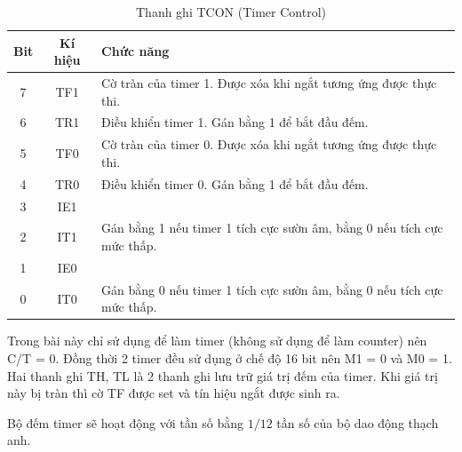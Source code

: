 \documentclass[../report.tex]{subfiles}
\begin{document}
\begin{table}[H]
\centering
\begin{tabular}{|c|c|l|}
\hline
\textbf{Bit} & \textbf{Kí hiệu} & \textbf{Chức năng}  \\
\hline
7 & TF1 & Cờ tràn của timer 1. Được xóa khi ngắt tương ứng được thực thi. \\
\hline
6 & TR1 & Điều khiển timer 1. Gán bằng 1 để bắt đầu đếm.  \\
\hline
5 & TF0 & Cờ tràn của timer 0. Được xóa khi ngắt tương ứng được thực thi. \\
\hline
4 & TR0 & Điều khiển timer 0. Gán bằng 1 để bắt đầu đếm. \\
\hline
3 & IE1 &  \\
\hline
2 & IT1 & Gán bằng 1 nếu timer 1 tích cực sườn âm, bằng 0 nếu tích cực mức thấp. \\
\hline
1 & IE0 & \\
\hline
0 & IT0 & Gán bằng 0 nếu timer 1 tích cực sườn âm, bằng 0 nếu tích cực mức thấp. \\
\hline
\end{tabular}
\caption{Thanh ghi TCON (Timer Control)} 
\end{table}

Trong bài này chỉ sử dụng để làm timer (không sử dụng để làm counter) nên C/T = 0. 
Đồng thời 2 timer đều sử dụng ở chế độ 16 bit nên M1 = 0 và M0 = 1. 
Hai thanh ghi TH, TL là 2 thanh ghi lưu trữ giá trị đếm của timer. Khi giá trị này bị tràn thì cờ TF được set và 
tín hiệu ngắt được sinh ra.  

Bộ đếm timer sẽ hoạt động với tần số bằng $1/12$ tần số của bộ dao động thạch anh. 
\end{document}
